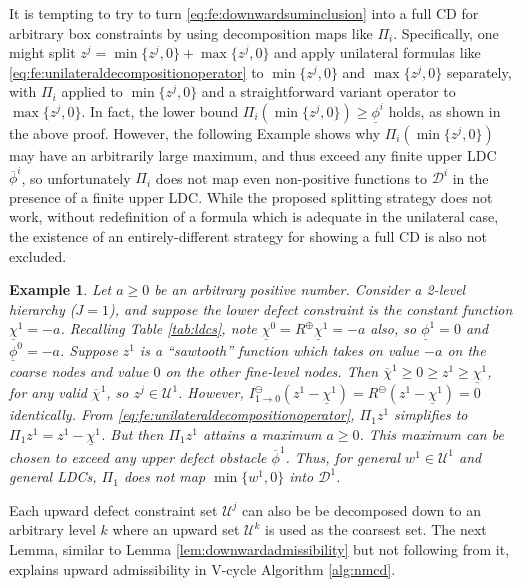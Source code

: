 \documentclass[letterpaper,final,12pt,reqno]{amsart}
\theoremstyle{cstyle}
\theoremstyle{cstyle*}
\theoremstyle{dstyle}
\newtheorem{example}[theorem]{Example}
\numberwithin{equation}{section}
\numberwithin{figure}{section}
\numberwithin{table}{section}
\numberwithin{theorem}{section}
\newcommand{\maxR}{R^{\bm{\oplus}}}
\newcommand{\minR}{R^{\bm{\ominus}}}
\begin{document}
It is tempting to try to turn \eqref{eq:fe:downwardsuminclusion} into a full CD for arbitrary box constraints by using decomposition maps like $\Pi_i$.  Specifically, one might split $z^j = \min\{z^j,0\} + \max\{z^j,0\}$ and apply unilateral formulas like \eqref{eq:fe:unilateraldecompositionoperator} to $\min\{z^j,0\}$ and $\max\{z^j,0\}$ separately, with $\Pi_i$ applied to $\min\{z^j,0\}$ and a straightforward variant operator to $\max\{z^j,0\}$.  In fact, the lower bound $\Pi_i (\min\{z^j,0\}) \ge \underline{\phi}^i$ holds, as shown in the above proof.  However, the following Example shows why $\Pi_i(\min\{z^j,0\})$ may have an arbitrarily large maximum, and thus exceed any finite upper LDC $\overline{\phi}^i$, so unfortunately $\Pi_i$ does not map even non-positive functions to $\mathcal{D}^i$ in the presence of a finite upper LDC.  While the proposed splitting strategy does not work, without redefinition of a formula which is adequate in the unilateral case, the existence of an entirely-different strategy for showing a full CD is also not excluded.

\begin{example}  \label{ex:notfullcd}
Let $a\ge 0$ be an arbitrary positive number.  Consider a 2-level hierarchy ($J=1$), and suppose the lower defect constraint is the constant function $\underline{\chi}^1=-a$.  Recalling Table \ref{tab:ldcs}, note $\underline{\chi}^0=\maxR \underline{\chi}^1=-a$ also, so $\underline{\phi}^1=0$ and $\underline{\phi}^0=-a$.  Suppose $z^1$ is a ``sawtooth'' function which takes on value $-a$ on the coarse nodes and value $0$ on the other fine-level nodes.  Then $\overline{\chi}^1 \ge 0 \ge z^1\ge \underline{\chi}^1$, for any valid $\overline{\chi}^1$, so $z^j \in \mathcal{U}^1$.  However, $I_{1\to 0}^\ominus(z^1 - \underline{\chi}^1) = \minR(z^1 - \underline{\chi}^1) = 0$ identically.  From \eqref{eq:fe:unilateraldecompositionoperator}, $\Pi_1 z^1$ simplifies to $\Pi_1 z^1 = z^1 - \underline{\chi}^1$.  But then $\Pi_1 z^1$ attains a maximum $a\ge 0$.  This maximum can be chosen to exceed any upper defect obstacle $\overline{\phi}^1$.  Thus, for general $w^1 \in \mathcal{U}^1$ and general LDCs, $\Pi_1$ does not map $\min\{w^1,0\}$ into $\mathcal{D}^1$.
\end{example}

Each upward defect constraint set $\mathcal{U}^j$ can also be be decomposed down to an arbitrary level $k$ where an upward set $\mathcal{U}^k$ is used as the coarsest set.  The next Lemma, similar to Lemma \ref{lem:downwardadmissibility} but not following from it, explains upward admissibility in V-cycle Algorithm \ref{alg:nmcd}.
\end{document}
